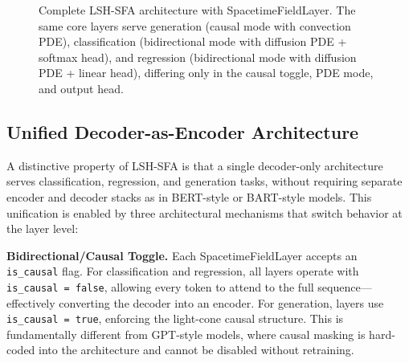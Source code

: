 \documentclass{article}
\begin{document}
\begin{figure}[t]
\caption{Complete LSH-SFA architecture with SpacetimeFieldLayer. The same core layers serve generation (causal mode with convection PDE), classification (bidirectional mode with diffusion PDE + softmax head), and regression (bidirectional mode with diffusion PDE + linear head), differing only in the causal toggle, PDE mode, and output head.}
\label{fig:architecture}
\end{figure}

\subsection{Unified Decoder-as-Encoder Architecture}

A distinctive property of LSH-SFA is that a single decoder-only architecture serves classification, regression, and generation tasks, without requiring separate encoder and decoder stacks as in BERT-style or BART-style models. This unification is enabled by three architectural mechanisms that switch behavior at the layer level:

\textbf{Bidirectional/Causal Toggle.} Each SpacetimeFieldLayer accepts an \texttt{is\_causal} flag. For classification and regression, all layers operate with \texttt{is\_causal = false}, allowing every token to attend to the full sequence---effectively converting the decoder into an encoder. For generation, layers use \texttt{is\_causal = true}, enforcing the light-cone causal structure. This is fundamentally different from GPT-style models, where causal masking is hard-coded into the architecture and cannot be disabled without retraining.
\end{document}
